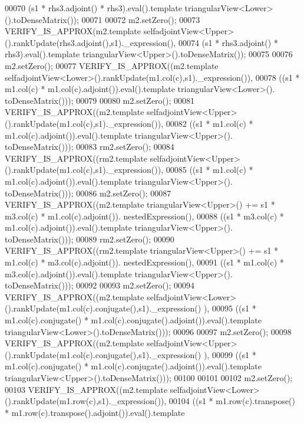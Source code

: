 \begin{DoxyCode}
00070                    (s1 * rhs3.adjoint() * rhs3).eval().template triangularView<Lower>().toDenseMatrix());
00071 
00072   m2.setZero();
00073   VERIFY\_IS\_APPROX(m2.template selfadjointView<Upper>().rankUpdate(rhs3.adjoint(),s1).\_expression(),
00074                    (s1 * rhs3.adjoint() * rhs3).eval().template triangularView<Upper>().toDenseMatrix());
00075                    
00076   m2.setZero();
00077   VERIFY\_IS\_APPROX((m2.template selfadjointView<Lower>().rankUpdate(m1.col(c),s1).\_expression()),
00078                    ((s1 * m1.col(c) * m1.col(c).adjoint()).eval().template triangularView<Lower>().
      toDenseMatrix()));
00079                    
00080   m2.setZero();
00081   VERIFY\_IS\_APPROX((m2.template selfadjointView<Upper>().rankUpdate(m1.col(c),s1).\_expression()),
00082                    ((s1 * m1.col(c) * m1.col(c).adjoint()).eval().template triangularView<Upper>().
      toDenseMatrix()));
00083   rm2.setZero();
00084   VERIFY\_IS\_APPROX((rm2.template selfadjointView<Upper>().rankUpdate(m1.col(c),s1).\_expression()),
00085                    ((s1 * m1.col(c) * m1.col(c).adjoint()).eval().template triangularView<Upper>().
      toDenseMatrix()));
00086   m2.setZero();
00087   VERIFY\_IS\_APPROX((m2.template triangularView<Upper>() += s1 * m3.col(c) * m1.col(c).adjoint()).
      nestedExpression(),
00088                    ((s1 * m3.col(c) * m1.col(c).adjoint()).eval().template triangularView<Upper>().
      toDenseMatrix()));
00089   rm2.setZero();
00090   VERIFY\_IS\_APPROX((rm2.template triangularView<Upper>() += s1 * m1.col(c) * m3.col(c).adjoint()).
      nestedExpression(),
00091                    ((s1 * m1.col(c) * m3.col(c).adjoint()).eval().template triangularView<Upper>().
      toDenseMatrix()));
00092   
00093   m2.setZero();
00094   VERIFY\_IS\_APPROX((m2.template selfadjointView<Lower>().rankUpdate(m1.col(c).conjugate(),s1).\_expression()
      ),
00095                    ((s1 * m1.col(c).conjugate() * m1.col(c).conjugate().adjoint()).eval().template 
      triangularView<Lower>().toDenseMatrix()));
00096                    
00097   m2.setZero();
00098   VERIFY\_IS\_APPROX((m2.template selfadjointView<Upper>().rankUpdate(m1.col(c).conjugate(),s1).\_expression()
      ),
00099                    ((s1 * m1.col(c).conjugate() * m1.col(c).conjugate().adjoint()).eval().template 
      triangularView<Upper>().toDenseMatrix()));
00100   
00101   
00102   m2.setZero();
00103   VERIFY\_IS\_APPROX((m2.template selfadjointView<Lower>().rankUpdate(m1.row(c),s1).\_expression()),
00104                    ((s1 * m1.row(c).transpose() * m1.row(c).transpose().adjoint()).eval().template 

\end{DoxyCode}
